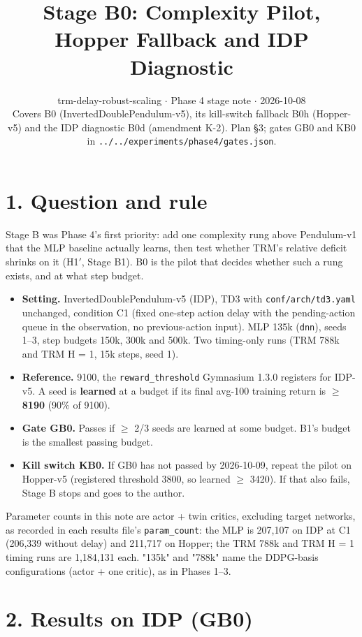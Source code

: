 \documentclass[11pt]{article}
\title{Stage B0: Complexity Pilot, Hopper Fallback and IDP Diagnostic}
\author{}
\date{trm-delay-robust-scaling $\cdot$ Phase 4 stage note $\cdot$ 2026-10-08\\[2pt]Covers B0 (InvertedDoublePendulum-v5), its kill-switch fallback B0h (Hopper-v5) and the IDP diagnostic B0d (amendment K-2). Plan \S{}3; gates GB0 and KB0 in \texttt{.\allowbreak{}.\allowbreak{}/\allowbreak{}.\allowbreak{}.\allowbreak{}/\allowbreak{}experiments/\allowbreak{}phase4/\allowbreak{}gates.\allowbreak{}json}.}
\begin{document}
\maketitle
\section*{1. Question and rule}



Stage B was Phase 4's first priority: add one complexity rung above Pendulum-v1 that the MLP baseline actually learns, then test whether TRM's relative deficit shrinks on it (H1$'$, Stage B1). B0 is the pilot that decides whether such a rung exists, and at what step budget.



\begin{itemize}
\item \textbf{Setting.} InvertedDoublePendulum-v5 (IDP), TD3 with \texttt{conf/\allowbreak{}arch/\allowbreak{}td3.\allowbreak{}yaml} unchanged, condition C1 (fixed one-step action delay with the pending-action queue in the observation, no previous-action input). MLP 135k (\texttt{dnn}), seeds 1--3, step budgets 150k, 300k and 500k. Two timing-only runs (TRM 788k and TRM H = 1, 15k steps, seed 1).
\item \textbf{Reference.} 9100, the \texttt{reward\_\allowbreak{}threshold} Gymnasium 1.3.0 registers for IDP-v5. A seed is \textbf{learned} at a budget if its final avg-100 training return is $\geq$ \textbf{8190} (90\% of 9100).
\item \textbf{Gate GB0.} Passes if $\geq$ 2/3 seeds are learned at some budget. B1's budget is the smallest passing budget.
\item \textbf{Kill switch KB0.} If GB0 has not passed by 2026-10-09, repeat the pilot on Hopper-v5 (registered threshold 3800, so learned $\geq$ 3420). If that also fails, Stage B stops and goes to the author.
\end{itemize}



Parameter counts in this note are actor + twin critics, excluding target networks, as recorded in each results file's \texttt{param\_count}: the MLP is 207,107 on IDP at C1 (206,339 without delay) and 211,717 on Hopper; the TRM 788k and TRM H = 1 timing runs are 1,184,131 each. "135k" and "788k" name the DDPG-basis configurations (actor + one critic), as in Phases 1--3.



\section*{2. Results on IDP (GB0)}
\end{document}
